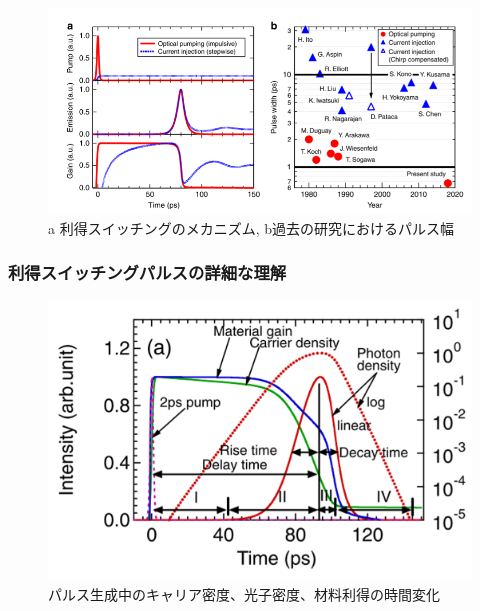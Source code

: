 \begin{figure}[h]
	\centering
	\includegraphics[width=15cm]{figure/fig_1_1_GS_ito.png}
	\caption{a 利得スイッチングのメカニズム, b過去の研究におけるパルス幅\cite{ref_t_ito}}
	\label{fig:fig_1_1_GS_ito}
\end{figure}

\newpage
\subsubsection{利得スイッチングパルスの詳細な理解}
\begin{figure}[ht]
	\centering
	\includegraphics[width=15cm]{figure/fig_1_1_GS_pulse.png}
	\caption{パルス生成中のキャリア密度、光子密度、材料利得の時間変化\cite{ref_1_1_GS}}
	\label{fig:fig_1_1_GS_pulse}
\end{figure}

